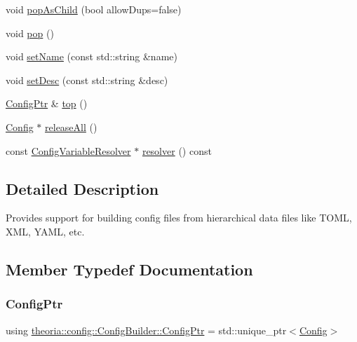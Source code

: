 \begin{DoxyCompactItemize}
\item 
void \hyperlink{classtheoria_1_1config_1_1ConfigBuilder_acd995045c0bf17d35da9573cf53ec791}{pop\+As\+Child} (bool allow\+Dups=false)
\item 
void \hyperlink{classtheoria_1_1config_1_1ConfigBuilder_accda8a312be22d56b33adb47d5b266e9}{pop} ()
\item 
void \hyperlink{classtheoria_1_1config_1_1ConfigBuilder_a19eea792ee2bc01c44806d2a5a9f666c}{set\+Name} (const std\+::string \&name)
\item 
void \hyperlink{classtheoria_1_1config_1_1ConfigBuilder_a7aa67220439e90e9fa59082355c8186f}{set\+Desc} (const std\+::string \&desc)
\item 
\hyperlink{classtheoria_1_1config_1_1ConfigBuilder_a31d4cfc983e8ad468c483822731d790f}{Config\+Ptr} \& \hyperlink{classtheoria_1_1config_1_1ConfigBuilder_a394d42770a90532be340a8af46868f79}{top} ()
\item 
\hyperlink{classtheoria_1_1config_1_1Config}{Config} $\ast$ \hyperlink{classtheoria_1_1config_1_1ConfigBuilder_a06911a804a22e89101dab7ca3a08b049}{release\+All} ()
\item 
const \hyperlink{classtheoria_1_1config_1_1ConfigVariableResolver}{Config\+Variable\+Resolver} $\ast$ \hyperlink{classtheoria_1_1config_1_1ConfigBuilder_aa40d918441c9cbc0b60bdcd39551164f}{resolver} () const
\end{DoxyCompactItemize}


\subsection{Detailed Description}
Provides support for building config files from hierarchical data files like T\+O\+ML, X\+ML, Y\+A\+ML, etc. 

\subsection{Member Typedef Documentation}
\mbox{\label{classtheoria_1_1config_1_1ConfigBuilder_a31d4cfc983e8ad468c483822731d790f}} 
\subsubsection{\texorpdfstring{Config\+Ptr}{ConfigPtr}}
{\footnotesize\ttfamily using \hyperlink{classtheoria_1_1config_1_1ConfigBuilder_a31d4cfc983e8ad468c483822731d790f}{theoria\+::config\+::\+Config\+Builder\+::\+Config\+Ptr} =  std\+::unique\+\_\+ptr$<$\hyperlink{classtheoria_1_1config_1_1Config}{Config}$>$}

